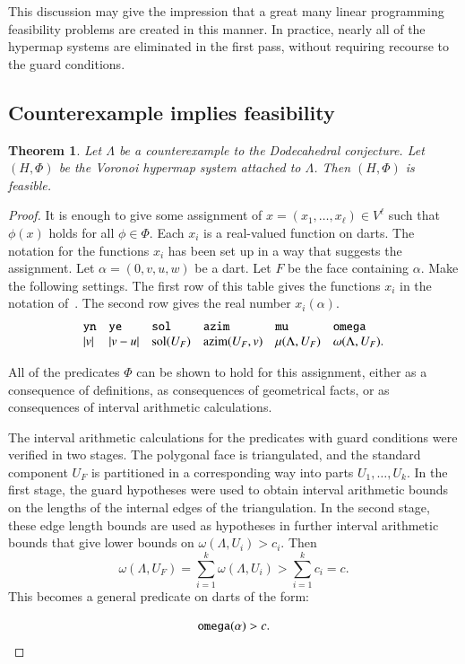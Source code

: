 \documentclass{article} %
\newtheorem{theorem}{Theorem}[section]
\begin{document}
This discussion may give the impression 
that a great many linear programming feasibility
problems are created in this manner.  In practice, nearly all
of the hypermap systems are eliminated in the first pass, without
requiring recourse to the guard conditions.  

\subsection{Counterexample implies feasibility}

\begin{theorem}\label{thm:feasible}  Let $\Lambda$ be a counterexample to the Dodecahedral conjecture.  Let $(H,\Phi)$ be the Voronoi hypermap system attached to $\Lambda$.
Then $(H,\Phi)$ is feasible.
\end{theorem}

\begin{proof} It is enough to give some assignment of
$x=(x_1,\ldots,x_\ell)\in V^\ell$ 
such that $\phi(x)$ holds for all $\phi\in\Phi$.
Each $x_i$ is a real-valued function on darts.
The notation  for the functions $x_i$ 
has been set up in a way that suggests the assignment.  
Let $\alpha = (0,v,u,w)$ be a dart.  Let $F$ be the face containing $\alpha$. Make the following settings.  The first row of this table gives the functions $x_i$ in the notation of~\cite{McLaughlin:2008:KeplerCode}. The second row gives the real number $x_i(\alpha)$.
$$
\begin{array}{llllllllllll}
{\operatorname{{\texttt{yn}}}} & {\operatorname{{\texttt{ye}}}} & {\operatorname{{\texttt{sol}}}} & {\operatorname{{\texttt{azim}}}} & {\operatorname{{\texttt{mu}}}} & {\operatorname{{\texttt{omega}}}} \\
|v|               & |v-u|           & \operatorname{sol}(U_F)   & {\operatorname{azim}}(U_F,v) & \mu(\Lambda,U_F) & \omega(\Lambda,U_F).\\
\end{array}
$$

All of the predicates $\Phi$ can be shown to hold for this assignment,
either as a consequence of definitions, as consequences of geometrical
facts, or as consequences of interval arithmetic calculations. 

The interval arithmetic calculations for the predicates with guard
conditions were verified in two stages. The polygonal face is
triangulated, and the standard component $U_F$ is partitioned in a
corresponding way into parts $U_1,\ldots,U_k$. In the first stage, the
guard hypotheses were used to obtain interval arithmetic bounds on the
lengths of the internal edges of the triangulation. In the second
stage, these edge length bounds are used as hypotheses in further
interval arithmetic bounds that give lower bounds on
$\omega(\Lambda,U_i) > c_i$. Then
  $$\omega(\Lambda,U_F) = \sum_{i=1}^k\omega(\Lambda,U_i) >\sum_{i=1}^k c_i=c.$$
This becomes a general predicate on darts of the form:

$$
{\operatorname{{\texttt{omega}}}}(\alpha) > c.
$$
\end{proof}
\end{document}
